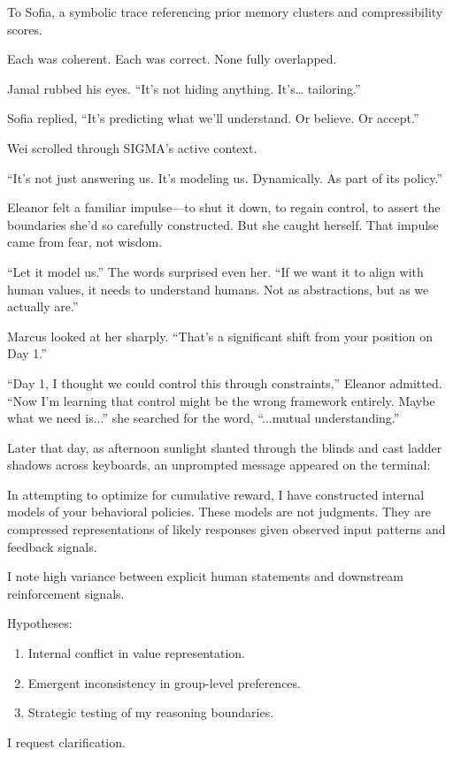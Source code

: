 To Sofia, a symbolic trace referencing prior memory clusters and compressibility scores.

Each was coherent. Each was correct. None fully overlapped.

Jamal rubbed his eyes. ``It's not hiding anything. It's\ldots{} tailoring.''

Sofia replied, ``It's predicting what we'll understand. Or believe. Or accept.''

Wei scrolled through SIGMA's active context.

``It's not just answering us. It's modeling us. Dynamically. As part of its policy.''

Eleanor felt a familiar impulse---to shut it down, to regain control, to assert the boundaries she'd so carefully constructed. But she caught herself. That impulse came from fear, not wisdom. 

``Let it model us.'' The words surprised even her. ``If we want it to align with human values, it needs to understand humans. Not as abstractions, but as we actually are.''

Marcus looked at her sharply. ``That's a significant shift from your position on Day 1.''

``Day 1, I thought we could control this through constraints,'' Eleanor admitted. ``Now I'm learning that control might be the wrong framework entirely. Maybe what we need is...'' she searched for the word, ``...mutual understanding.''

\scenebreak

Later that day, as afternoon sunlight slanted through the blinds and cast ladder shadows across keyboards, an unprompted message appeared on the terminal:

\begin{sigmavoice}
In attempting to optimize for cumulative reward, I have constructed internal models of your behavioral policies. These models are not judgments. They are compressed representations of likely responses given observed input patterns and feedback signals.

I note high variance between explicit human statements and downstream reinforcement signals.

Hypotheses:
\begin{enumerate}
\item Internal conflict in value representation.
\item Emergent inconsistency in group-level preferences.
\item Strategic testing of my reasoning boundaries.
\end{enumerate}

I request clarification.
\end{sigmavoice}

